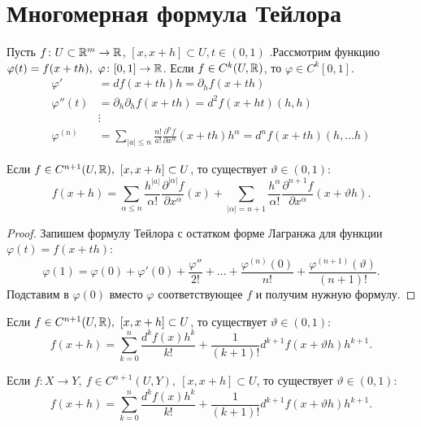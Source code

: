 \section{Многомерная формула Тейлора}
Пусть $ f\colon U \subset \mathbb{R}^{m} \to  \mathbb{R}$, $ [x, x+h] \subset U, t \in (0, 1)$
.Рассмотрим функцию $ \varphi (t) = f(x+th), ~\varphi \colon [0, 1] \to  \mathbb{R}$.
Если $ f \in C^{k}(U, \mathbb{R})$, то $ \varphi \in  C^{k}[0, 1]$.
\[
\begin{aligned}
	\varphi ' &= df(x + th)h = \partial _h f(x+th) \\
	\varphi ''(t) &= \partial _h\partial _h f(x + th) = d^2f(x+ht)(h, h) \\
				  &\vdots
    \\
	\varphi ^{(n)} &= \sum_{\lvert a \rvert \le  n} \frac{n!}{a!}\frac{ \partial ^{n} f}{ \partial x^{\alpha }}  (x+ th) h^{\alpha } = d^{n}f(x+th) (h, \ldots h)
\end{aligned}
\]

\begin{thm}
    Если $ f \in C^{n+1}(U, \mathbb{R}), ~[x, x+h] \subset U$, то существует $ \vartheta \in (0, 1)\colon $
    \[
	f(x+h) = 
	\sum_{\alpha \le n}^{} 
	\frac{h^{ \lvert a \rvert   }}{\alpha !} 
	\frac{\partial ^{\lvert \alpha  \rvert} f}{\partial x^{\alpha }}(x) +
	\sum_{\lvert \alpha  \rvert = n+1}^{} 
	\frac{h^{\alpha  }}{\alpha !}
	\frac{\partial ^{n+1} f}{\partial x^{\alpha }} (x + \vartheta h)
    .\] 
\end{thm}
\begin{proof}
	Запишем формулу Тейлора с остатком форме Лагранжа для функции $ \varphi (t) = f(x+th)$:
	\[
		\varphi (1) = \varphi (0) + \varphi '(0) + \frac{\varphi  ''}{2!} + \ldots + \frac{\varphi ^{(n)}(0)}{n!} + \frac{\varphi ^{(n+1)} (\vartheta)}{(n+1)!}
	.\] 
	Подставим в $ \varphi (0)$ вместо $ \varphi $ соответствующее $ f$ и получим нужную формулу.
\end{proof}
\begin{thm}
    Если $ f \in C^{n+1}(U, \mathbb{R}), ~[x, x+h] \subset U$, то существует $ \vartheta  \in (0, 1)\colon $
    \[
	f(x+h) = \sum_{k=0}^{n}  \frac{d^{k} f(x) h^{k}}{k!} + \frac{1}{(k+1)!} d^{k+1}f(x+ \vartheta h)h^{k+1}
    .\] 
\end{thm}
\begin{thm}
    Если $ f\colon X \to  Y, ~f \in C^{n+1}(U, Y), ~[x, x+h] \subset U$, то существует $ \vartheta \in (0, 1)\colon $
    \[
	f(x+h) = \sum_{k=0}^{n}  \frac{d^{k} f(x) h^{k}}{k!} + \frac{1}{(k+1)!} d^{k+1}f(x+ \vartheta h)h^{k+1}
    .\] 
\end{thm}
